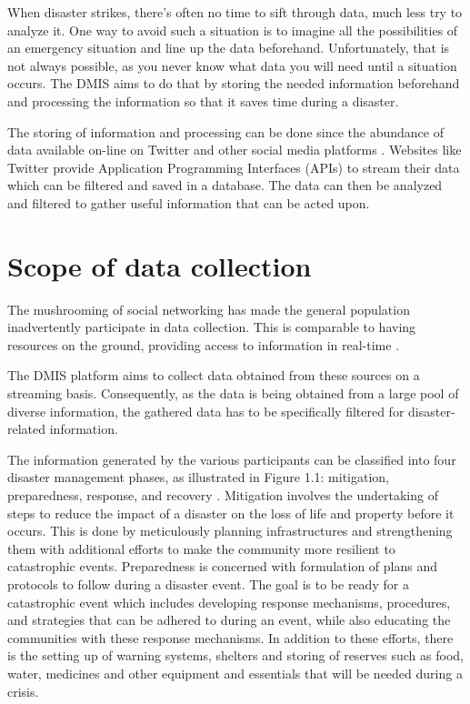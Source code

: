 When disaster strikes, there's often no time to sift through data, much less try to analyze it. One way to avoid such a situation is to imagine all the possibilities of an emergency situation and line up the data beforehand. Unfortunately, that is not always possible, as you never know what data you will need until a situation occurs. The DMIS aims to do that by storing the needed information beforehand and processing the information so that it saves time during a disaster.

The storing of information and processing can be done since the abundance of data available on-line on Twitter and other social media platforms \cite{hristidis2010survey}. Websites like Twitter provide Application Programming Interfaces (APIs) to stream their data which can be filtered and saved in a database. The data can then be analyzed and filtered to gather useful information that can be acted upon.

\section{Scope of data collection} 

The mushrooming of social networking has made the general population inadvertently participate in data collection. This is comparable to having resources on the ground, providing access to information in real-time \cite{de2011use}.

The DMIS platform aims to collect data obtained from these sources on a streaming basis. Consequently, as the data is being obtained from a large pool of diverse information, the gathered data has to be specifically filtered for disaster-related information.

The information generated by the various participants can be classified into four disaster management phases, as illustrated in Figure 1.1: mitigation, preparedness, response, and recovery \cite{coppola2006introduction}. Mitigation involves the undertaking of steps to reduce the impact of a disaster on the loss of life and property before it occurs. This is done by meticulously planning infrastructures and strengthening them with additional efforts to make the community more resilient to catastrophic events. Preparedness is concerned with formulation of plans and protocols to follow during a disaster event. The goal is to be ready for a catastrophic event which includes developing response mechanisms, procedures, and strategies that can be adhered to during an event, while also educating the communities with these response mechanisms. In addition to these efforts, there is the setting up of warning systems, shelters and storing of reserves such as food, water, medicines and other equipment and essentials that will be needed during a crisis. 

